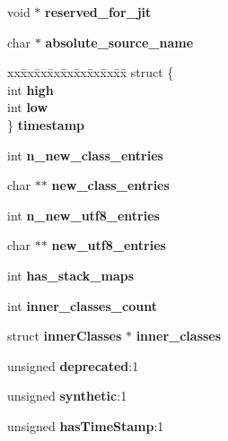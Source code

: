 \begin{DoxyCompactItemize}
\item 
void $\ast$ {\bfseries reserved\_\-for\_\-jit}\label{struct_classjava__lang___class_a32e6fc7c29408f341f23a32032b628ca}

\item 
char $\ast$ {\bfseries absolute\_\-source\_\-name}\label{struct_classjava__lang___class_ab98a410b34f207c166bb70164244af43}

\item 
\begin{tabbing}
xx\=xx\=xx\=xx\=xx\=xx\=xx\=xx\=xx\=\kill
struct \{\\
\>int {\bfseries high}\\
\>int {\bfseries low}\\
\} {\bfseries timestamp}\label{struct_classjava__lang___class_ad017916b59545b00c9f2f8a15aaeb65c}
\\

\end{tabbing}\item 
int {\bfseries n\_\-new\_\-class\_\-entries}\label{struct_classjava__lang___class_ad37bad0a9a879d9a862deaab3b1e91aa}

\item 
char $\ast$$\ast$ {\bfseries new\_\-class\_\-entries}\label{struct_classjava__lang___class_a4b0476c640191e2839e2fb5b41981abd}

\item 
int {\bfseries n\_\-new\_\-utf8\_\-entries}\label{struct_classjava__lang___class_aa2f7e5922d85cdd6fc9d5d4f7b4095df}

\item 
char $\ast$$\ast$ {\bfseries new\_\-utf8\_\-entries}\label{struct_classjava__lang___class_a9bd9f4452cd041d1f8984674fc09e4fb}

\item 
int {\bfseries has\_\-stack\_\-maps}\label{struct_classjava__lang___class_a093f940534d5d052e57644ba70e161fb}

\item 
int {\bfseries inner\_\-classes\_\-count}\label{struct_classjava__lang___class_a482054f3f18f15f260cb7ddce1e7c3d3}

\item 
struct {\bf innerClasses} $\ast$ {\bfseries inner\_\-classes}\label{struct_classjava__lang___class_ac70786e1032da6cd7e4dc5e01f684883}

\item 
unsigned {\bfseries deprecated}:1\label{struct_classjava__lang___class_acb7f1c5a930b7ba7442b5591de1e7324}

\item 
unsigned {\bfseries synthetic}:1\label{struct_classjava__lang___class_a926aad4f219bf890eb35158aed98a0a4}

\item 
unsigned {\bfseries hasTimeStamp}:1\label{struct_classjava__lang___class_a1fa8960310f82e05d90ed1cba10691c6}

\end{DoxyCompactItemize}


